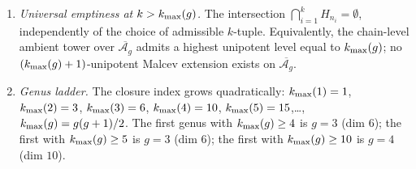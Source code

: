\begin{theorem}
\begin{enumerate}[label=\textup{(\alph*)}]
\begin{equation}
\circ\Bigl(\textstyle\sum_{i=1}^{k}N_i+\lambda_{\{k_i\}}\mathrm{id}\Bigr)^{-1}
\circ(\mathrm{id}+\sigma h^{(g)})^{-1}\circ\sigma
\end{equation}
satisfies
$[d^{\mathrm{k\text{-}uni}}_{\mathrm{bar}},h^{\mathrm{k\text{-}uni}}]
=\mathrm{id}-p^{\mathrm{k\text{-}uni}}$ with
$p^{\mathrm{k\text{-}uni}}=\prod_{i=1}^k p^{\Gamma}_{H_{n_i}}$.
\item \emph{Universal emptiness at $k>k_{\max}(g)$.} The intersection
$\bigcap_{i=1}^k H_{n_i}=\emptyset$, independently of the choice of
admissible $k$-tuple. Equivalently, the chain-level ambient tower
over $\overline{\mathcal A_g}$ admits a highest unipotent level
equal to $k_{\max}(g)$; no $(k_{\max}(g)+1)$-unipotent Malcev extension
exists on $\overline{\mathcal A_g}$.
\item \emph{Genus ladder.} The closure index grows quadratically:
$k_{\max}(1)=1$,
$k_{\max}(2)=3$,
$k_{\max}(3)=6$,
$k_{\max}(4)=10$,
$k_{\max}(5)=15$,\ldots,
$k_{\max}(g)=g(g+1)/2$. The first genus with
$k_{\max}(g)\ge 4$ is $g=3$ (dim $6$); the first with
$k_{\max}(g)\ge 5$ is $g=3$ (dim $6$); the first with
$k_{\max}(g)\ge 10$ is $g=4$ (dim $10$).
\end{enumerate}
\end{theorem}

